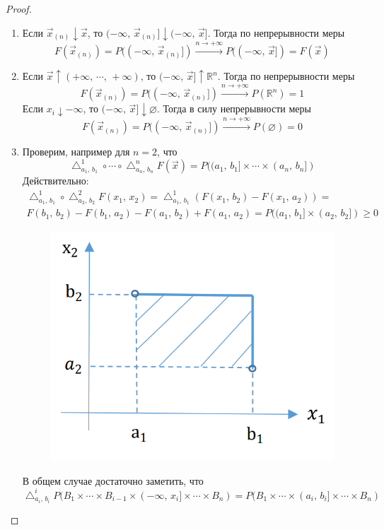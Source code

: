 \documentclass[a4paper,12pt]{article}
\renewcommand{\geq}{\ensuremath{\geqslant}}
\renewcommand{\emptyset}{\ensuremath{\varnothing}}
\theoremstyle{plain}
\theoremstyle{definition}
\theoremstyle{remark}
\begin{document}
\begin{proof}
	\begin{enumerate}
		\item Если $\vec{x}_{(n)} \downarrow \vec{x}$, то $(-\infty,\, \vec{x}_{(n)}] \downarrow (-\infty,\, \vec{x}]$. Тогда по непрерывности меры
		      \[
			      F(\vec{x}_{(n)}) = P((-\infty,\, \vec{x}_{(n)}]) \stackrel{n \to +\infty}{\to} P((-\infty,\, \vec{x}]) = F(\vec{x})
		      \]
		\item Если $\vec{x} \uparrow (+\infty,\,\cdots,\,+\infty)$, то $(-\infty,\, \vec{x}] \uparrow \mathbb{R}^n$. Тогда по непрерывности меры
		      \[F(\vec{x}_{(n)}) = P((-\infty,\, \vec{x}_{(n)}]) \stackrel{n \to +\infty}{\to} P(\mathbb{R}^n) = 1\]
		      Если $x_i \downarrow -\infty$, то $(-\infty,\, \vec{x}] \downarrow \emptyset$. Тогда в силу непрерывности меры
		      \[F(\vec{x}_{(n)}) = P((-\infty,\, \vec{x}_{(n)}]) \stackrel{n \to +\infty}{\to} P(\emptyset) = 0\]
		\item Проверим, например для $n = 2$, что
		      \[\bigtriangleup_{a_1,\,b_1}^1 \circ \cdots \circ \bigtriangleup_{a_n,\,b_n}^n F(\vec{x}) = P((a_1,\,b_1] \times\cdots\times (a_n,\,b_n])\]
          Действительно:
          \begin{align*}
            \bigtriangleup^1_{a_1,\,b_1} \circ\bigtriangleup^2_{a_2,\,b_2} F(x_1,\,x_2) = \bigtriangleup^1_{a_1,\,b_1} (F(x_1,\,b_2) - F(x_1,\,a_2)) =\\
            F(b_1,\,b_2) - F(b_1,\,a_2) - F(a_1,\,b_2) + F(a_1,\,a_2) = P((a_1,\,b_1] \times (a_2,\,b_2]) \geq 0 
          \end{align*}
          \begin{figure}[h]
            \includegraphics[scale=0.3]{img/f_example.png}
          \end{figure}


          В общем случае достаточно заметить, что 
          \[\bigtriangleup^i_{a_i,\,b_i}P(B_1\times\cdots\times B_{i - 1} \times (-\infty,\, x_i]\times\cdots\times B_n) = P(B_1\times\cdots\times(a_i,\,b_i]\times\cdots\times B_n)\]
	\end{enumerate}
\end{proof}
\end{document}
